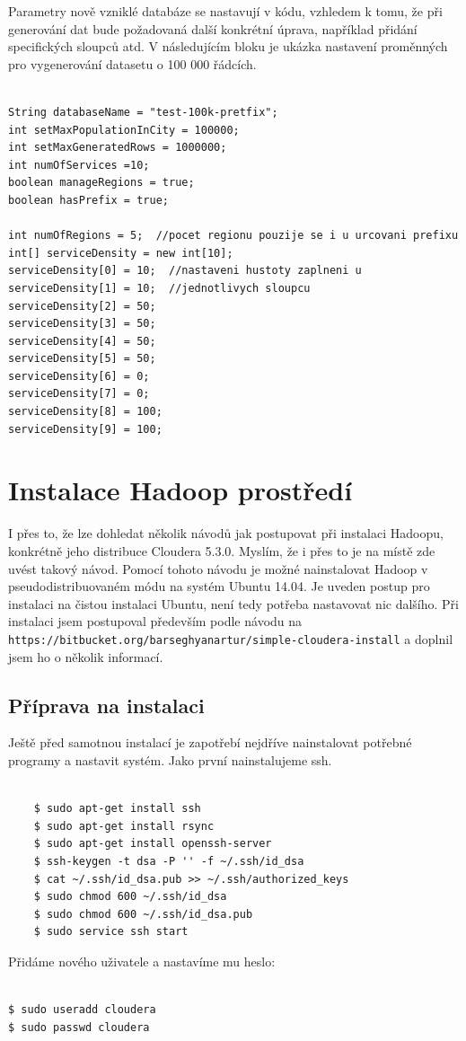 \documentclass[thesis=M,czech]{FITthesis}[2012/06/26]
\begin{document}
Parametry nově vzniklé databáze se nastavují v kódu, vzhledem k tomu, že při generování dat bude požadovaná další konkrétní úprava, například přidání specifických sloupců atd. V následujícím bloku je ukázka nastavení proměnných pro vygenerování datasetu o 100 000 řádcích. 

\begin{lstlisting}[frame=single]  % Start your code-block

String databaseName = "test-100k-pretfix";
int setMaxPopulationInCity = 100000;
int setMaxGeneratedRows = 1000000;
int numOfServices =10; 
boolean manageRegions = true;
boolean hasPrefix = true;
        
int numOfRegions = 5;  //pocet regionu pouzije se i u urcovani prefixu
int[] serviceDensity = new int[10];
serviceDensity[0] = 10;  //nastaveni hustoty zaplneni u
serviceDensity[1] = 10;  //jednotlivych sloupcu
serviceDensity[2] = 50; 
serviceDensity[3] = 50; 
serviceDensity[4] = 50; 
serviceDensity[5] = 50;  
serviceDensity[6] = 0;   
serviceDensity[7] = 0;  
serviceDensity[8] = 100;
serviceDensity[9] = 100; 
\end{lstlisting}        


\chapter{Instalace Hadoop prostředí}
I přes to, že lze dohledat několik návodů jak postupovat při instalaci Hadoopu, konkrétně jeho distribuce Cloudera 5.3.0. Myslím, že i přes to je na místě zde uvést takový návod. Pomocí tohoto návodu je možné nainstalovat Hadoop v pseudodistribuovaném módu na systém Ubuntu 14.04. Je uveden postup pro instalaci na čistou instalaci Ubuntu, není tedy potřeba nastavovat nic dalšího. Při instalaci jsem postupoval především podle návodu na  \texttt{https://bitbucket.org/barseghyanartur/simple-cloudera-install} a doplnil jsem ho o několik informací.

\section{Příprava na instalaci}
Ještě před samotnou instalací je zapotřebí nejdříve nainstalovat potřebné programy a nastavit systém.
Jako první nainstalujeme ssh.
\begin{lstlisting}[frame=single]  % Start your code-block

    $ sudo apt-get install ssh
    $ sudo apt-get install rsync
    $ sudo apt-get install openssh-server
    $ ssh-keygen -t dsa -P '' -f ~/.ssh/id_dsa
    $ cat ~/.ssh/id_dsa.pub >> ~/.ssh/authorized_keys
    $ sudo chmod 600 ~/.ssh/id_dsa
    $ sudo chmod 600 ~/.ssh/id_dsa.pub
    $ sudo service ssh start
\end{lstlisting} 
Přidáme nového uživatele a nastavíme mu heslo:
\begin{lstlisting}[frame=single]  % Start your code-block

$ sudo useradd cloudera
$ sudo passwd cloudera
\end{lstlisting} 
\end{document}
